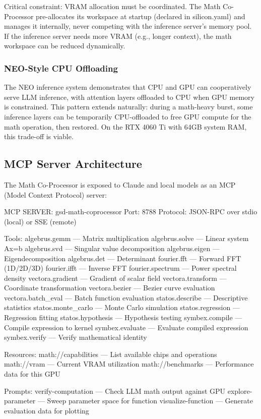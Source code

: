 \documentclass[11pt,letterpaper]{article}
\begin{document}
Critical constraint: VRAM allocation must be coordinated. The Math Co-Processor pre-allocates its workspace at startup (declared in silicon.yaml) and manages it internally, never competing with the inference server's memory pool. If the inference server needs more VRAM (e.g., longer context), the math workspace can be reduced dynamically.

\subsubsection{NEO-Style CPU Offloading}

The NEO inference system demonstrates that CPU and GPU can cooperatively serve LLM inference, with attention layers offloaded to CPU when GPU memory is constrained. This pattern extends naturally: during a math-heavy burst, some inference layers can be temporarily CPU-offloaded to free GPU compute for the math operation, then restored. On the RTX 4060 Ti with 64GB system RAM, this trade-off is viable.

\subsection{MCP Server Architecture}

The Math Co-Processor is exposed to Claude and local models as an MCP (Model Context Protocol) server:

\begin{asciibox}
MCP SERVER: gsd-math-coprocessor
  Port: 8788
  Protocol: JSON-RPC over stdio (local) or SSE (remote)

  Tools:
    algebrus.gemm       — Matrix multiplication
    algebrus.solve       — Linear system Ax=b
    algebrus.svd         — Singular value decomposition
    algebrus.eigen       — Eigendecomposition
    algebrus.det         — Determinant
    fourier.fft          — Forward FFT (1D/2D/3D)
    fourier.ifft         — Inverse FFT
    fourier.spectrum     — Power spectral density
    vectora.gradient     — Gradient of scalar field
    vectora.transform    — Coordinate transformation
    vectora.bezier       — Bezier curve evaluation
    vectora.batch_eval   — Batch function evaluation
    statos.describe      — Descriptive statistics
    statos.monte_carlo   — Monte Carlo simulation
    statos.regression    — Regression fitting
    statos.hypothesis    — Hypothesis testing
    symbex.compile       — Compile expression to kernel
    symbex.evaluate      — Evaluate compiled expression
    symbex.verify        — Verify mathematical identity

  Resources:
    math://capabilities  — List available chips and operations
    math://vram          — Current VRAM utilization
    math://benchmarks    — Performance data for this GPU

  Prompts:
    verify-computation   — Check LLM math output against GPU
    explore-parameter    — Sweep parameter space for function
    visualize-function   — Generate evaluation data for plotting
\end{asciibox}
\end{document}
